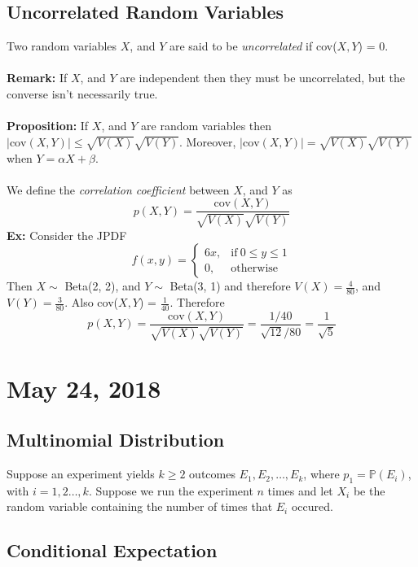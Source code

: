 \documentclass{article}
\newcommand{\ti}[1]{\textit{#1}}
\newcommand{\tb}[1]{\textbf{#1}}
\newcommand{\bbP}{\mathbb{P}}
\newcommand{\al}{\alpha}
\newcommand{\be}{\beta}
\newcommand{\prop}{\textbf{Proposition: }}
\newcommand{\exx}{\textbf{Ex: }}
\begin{document}
\subsection{Uncorrelated Random Variables}
Two random variables $X$, and $Y$ are said to be \ti{uncorrelated} if cov($X, Y$) = 0.\\\\
\tb{Remark:} If $X$, and $Y$ are independent then they must be uncorrelated, but the converse isn't necessarily true.\\\\
\prop If $X$, and $Y$ are random variables then $|\text{cov}(X, Y)| \leq \sqrt{V(X)}\sqrt{V(Y)}$. Moreover, $|\text{cov}(X, Y)| = \sqrt{V(X)}\sqrt{V(Y)}$ when $Y = \al X + \be$.\\\\
We define the \ti{correlation coefficient} between $X$, and $Y$ as
\[p(X, Y) = \frac{\text{cov}(X, Y)}{\sqrt{V(X)}\sqrt{V(Y)}}\]
\exx Consider the JPDF
\[
f(x, y) =
\begin{cases}
	6x, &\text{if}\ 0 \leq y \leq 1\\
	0, &\text{otherwise}
\end{cases}
\]
Then $X \sim$ Beta(2, 2), and $Y \sim$ Beta(3, 1) and therefore $V(X) = \frac{4}{80}$, and $V(Y) = \frac{3}{80}$. Also cov($X, Y$) = $\frac{1}{40}$. Therefore
\[p(X, Y) = \frac{\text{cov}(X, Y)}{\sqrt{V(X)}\sqrt{V(Y)}} = \frac{1/40}{\sqrt{12}/80} = \frac{1}{\sqrt{5}}\]
\newpage


\section{May 24, 2018}
\subsection{Multinomial Distribution}
Suppose an experiment yields $k \geq 2$ outcomes $E_{1}, E_{2}, \dots, E_{k}$, where $p_{1} = \bbP(E_{i})$, with $i = 1, 2 \dots, k$. Suppose we run the experiment $n$ times and let $X_{i}$ be the random variable containing the number of times that $E_{i}$ occured.
\subsection{Conditional Expectation}
\newpage
\end{document}
